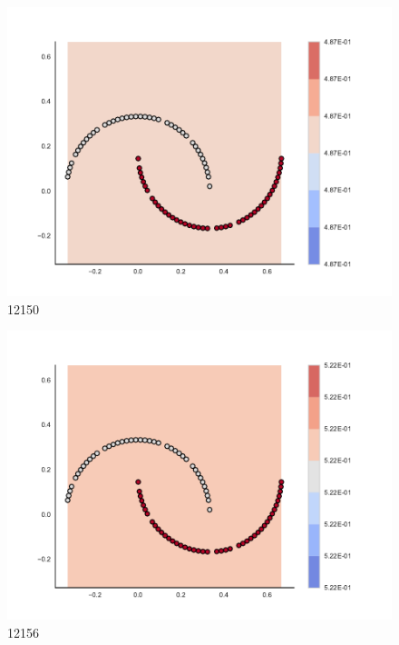\begin{subfigure}[b]{0.09\textwidth}
    \includegraphics[clip, trim=2.35cm 1.75cm 4.5cm 0cm,width=\textwidth]{img/convergence/12150.pdf}
    \caption{12150}
    \label{fig:convergence_12150}
\end{subfigure}
%
\begin{subfigure}[b]{0.09\textwidth}
    \includegraphics[clip, trim=2.35cm 1.75cm 4.5cm 0cm,width=\textwidth]{img/convergence/12156.pdf}
    \caption{12156}
    \label{fig:convergence_12156}
\end{subfigure}
%
